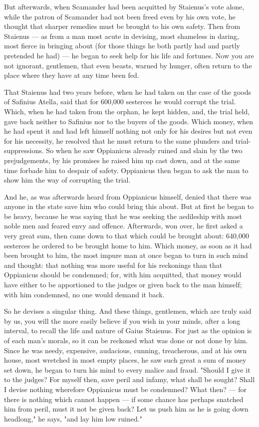  But afterwards, when Scamander had been acquitted by Staienus's vote alone, while the patron of Scamander had not been freed even by his own vote, he thought that sharper remedies must be brought to his own safety. Then from Staienus --- as from a man most acute in devising, most shameless in daring, most fierce in bringing about (for those things he both partly had and partly pretended he had) --- he began to seek help for his life and fortunes. Now you are not ignorant, gentlemen, that even beasts, warned by hunger, often return to the place where they have at any time been fed.

 That Staienus had two years before, when he had taken on the case of the goods of Safinius Atella, said that for 600,000 sesterces he would corrupt the trial. Which, when he had taken from the orphan, he kept hidden, and, the trial held, gave back neither to Safinius nor to the buyers of the goods. Which money, when he had spent it and had left himself nothing not only for his desires but not even for his necessity, he resolved that he must return to the same plunders and trial-suppressions. So when he saw Oppianicus already ruined and slain by the two prejudgements, by his promises he raised him up cast down, and at the same time forbade him to despair of safety. Oppianicus then began to ask the man to show him the way of corrupting the trial.

 And he, as was afterwards heard from Oppianicus himself, denied that there was anyone in the state save him who could bring this about. But at first he began to be heavy, because he was saying that he was seeking the aedileship with most noble men and feared envy and offence. Afterwards, won over, he first asked a very great sum, then came down to that which could be brought about: 640,000 sesterces he ordered to be brought home to him. Which money, as soon as it had been brought to him, the most impure man at once began to turn in such mind and thought: that nothing was more useful for his reckonings than that Oppianicus should be condemned; for, with him acquitted, that money would have either to be apportioned to the judges or given back to the man himself; with him condemned, no one would demand it back.

 So he devises a singular thing. And these things, gentlemen, which are truly said by us, you will the more easily believe if you wish in your minds, after a long interval, to recall the life and nature of Gaius Staienus. For just as the opinion is of each man's morals, so it can be reckoned what was done or not done by him. Since he was needy, expensive, audacious, cunning, treacherous, and at his own house, most wretched in most empty places, he saw such great a sum of money set down, he began to turn his mind to every malice and fraud. "Should I give it to the judges? For myself then, save peril and infamy, what shall be sought? Shall I devise nothing wherefore Oppianicus must be condemned? What then? --- for there is nothing which cannot happen --- if some chance has perhaps snatched him from peril, must it not be given back? Let us push him as he is going down headlong," he says, "and lay him low ruined."

